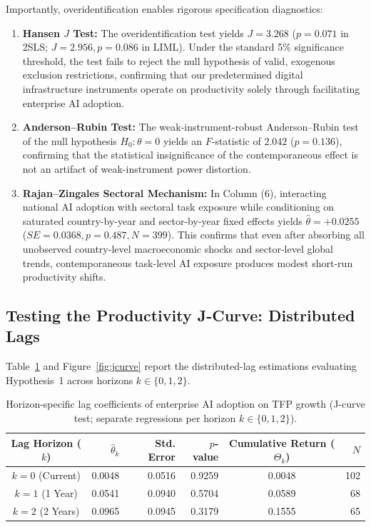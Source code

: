 \documentclass[11pt,a4paper]{article}
\begin{document}
Importantly, overidentification enables rigorous specification diagnostics:
\begin{enumerate}
    \item \textbf{Hansen $J$ Test:} The overidentification test yields $J = 3.268$ ($p = 0.071$ in 2SLS; $J = 2.956, p = 0.086$ in LIML). Under the standard 5\% significance threshold, the test fails to reject the null hypothesis of valid, exogenous exclusion restrictions, confirming that our predetermined digital infrastructure instruments operate on productivity solely through facilitating enterprise AI adoption.
    \item \textbf{Anderson--Rubin Test:} The weak-instrument-robust Anderson--Rubin test of the null hypothesis $H_0: \theta = 0$ yields an $F$-statistic of $2.042$ ($p = 0.136$), confirming that the statistical insignificance of the contemporaneous effect is not an artifact of weak-instrument power distortion.
    \item \textbf{Rajan--Zingales Sectoral Mechanism:} In Column (6), interacting national AI adoption with sectoral task exposure while conditioning on saturated country-by-year and sector-by-year fixed effects yields $\hat{\theta} = +0.0255$ ($SE = 0.0368, p = 0.487, N = 399$). This confirms that even after absorbing all unobserved country-level macroeconomic shocks and sector-level global trends, contemporaneous task-level AI exposure produces modest short-run productivity shifts.
\end{enumerate}

\subsection{Testing the Productivity J-Curve: Distributed Lags}
Table~\ref{tab:jcurve} and Figure~\ref{fig:jcurve} report the distributed-lag estimations evaluating Hypothesis~1 across horizons $k \in \{0, 1, 2\}$.

\begin{table}[!htbp]
\centering
\small
\begin{tabular}{crrrcr}
\toprule
\textbf{Lag Horizon ($k$)} & $\hat{\theta}_k$ & \textbf{Std. Error} & $p$\textbf{-value} & \textbf{Cumulative Return ($\Theta_k$)} & $N$ \\
\midrule
$k = 0$ (Current) & 0.0048 & 0.0516 & 0.9259 & 0.0048 & 102 \\
$k = 1$ (1 Year)  & 0.0541 & 0.0940 & 0.5704 & 0.0589 & 68 \\
$k = 2$ (2 Years) & 0.0965 & 0.0945 & 0.3179 & 0.1555 & 65 \\
\bottomrule
\end{tabular}
\caption{Horizon-specific lag coefficients of enterprise AI adoption on TFP growth (J-curve test; separate regressions per horizon $k \in \{0, 1, 2\}$).}
\label{tab:jcurve}
\end{table}
\end{document}

